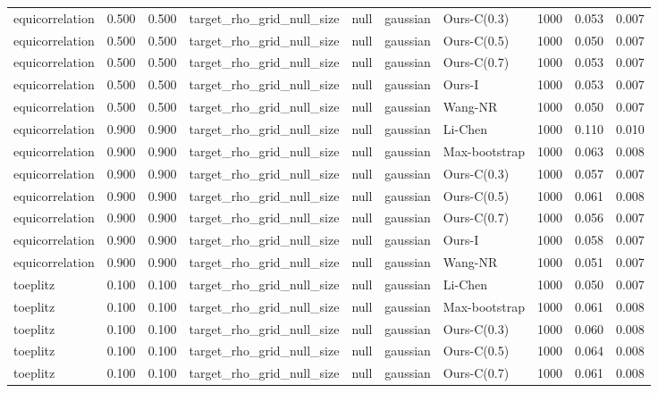 \begin{tabular}{lrrllllrrr}
equicorrelation & 0.500 & 0.500 & target\_rho\_grid\_null\_size & null & gaussian & Ours-C(0.3) & 1000 & 0.053 & 0.007 \\
equicorrelation & 0.500 & 0.500 & target\_rho\_grid\_null\_size & null & gaussian & Ours-C(0.5) & 1000 & 0.050 & 0.007 \\
equicorrelation & 0.500 & 0.500 & target\_rho\_grid\_null\_size & null & gaussian & Ours-C(0.7) & 1000 & 0.053 & 0.007 \\
equicorrelation & 0.500 & 0.500 & target\_rho\_grid\_null\_size & null & gaussian & Ours-I & 1000 & 0.053 & 0.007 \\
equicorrelation & 0.500 & 0.500 & target\_rho\_grid\_null\_size & null & gaussian & Wang-NR & 1000 & 0.050 & 0.007 \\
equicorrelation & 0.900 & 0.900 & target\_rho\_grid\_null\_size & null & gaussian & Li-Chen & 1000 & 0.110 & 0.010 \\
equicorrelation & 0.900 & 0.900 & target\_rho\_grid\_null\_size & null & gaussian & Max-bootstrap & 1000 & 0.063 & 0.008 \\
equicorrelation & 0.900 & 0.900 & target\_rho\_grid\_null\_size & null & gaussian & Ours-C(0.3) & 1000 & 0.057 & 0.007 \\
equicorrelation & 0.900 & 0.900 & target\_rho\_grid\_null\_size & null & gaussian & Ours-C(0.5) & 1000 & 0.061 & 0.008 \\
equicorrelation & 0.900 & 0.900 & target\_rho\_grid\_null\_size & null & gaussian & Ours-C(0.7) & 1000 & 0.056 & 0.007 \\
equicorrelation & 0.900 & 0.900 & target\_rho\_grid\_null\_size & null & gaussian & Ours-I & 1000 & 0.058 & 0.007 \\
equicorrelation & 0.900 & 0.900 & target\_rho\_grid\_null\_size & null & gaussian & Wang-NR & 1000 & 0.051 & 0.007 \\
toeplitz & 0.100 & 0.100 & target\_rho\_grid\_null\_size & null & gaussian & Li-Chen & 1000 & 0.050 & 0.007 \\
toeplitz & 0.100 & 0.100 & target\_rho\_grid\_null\_size & null & gaussian & Max-bootstrap & 1000 & 0.061 & 0.008 \\
toeplitz & 0.100 & 0.100 & target\_rho\_grid\_null\_size & null & gaussian & Ours-C(0.3) & 1000 & 0.060 & 0.008 \\
toeplitz & 0.100 & 0.100 & target\_rho\_grid\_null\_size & null & gaussian & Ours-C(0.5) & 1000 & 0.064 & 0.008 \\
toeplitz & 0.100 & 0.100 & target\_rho\_grid\_null\_size & null & gaussian & Ours-C(0.7) & 1000 & 0.061 & 0.008 \\

\end{tabular}
